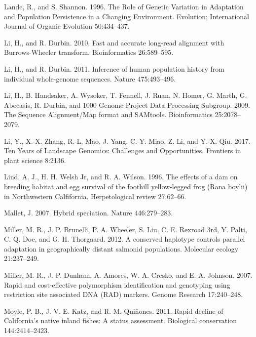 \documentclass[proquest,12pt,final]{ucthesis-CA2012} %
\begin{document}
\begin{ucmainmatter}
\leavevmode\hypertarget{ref-lande_role_1996}{}%
Lande, R., and S. Shannon. 1996. The Role of Genetic Variation in
Adaptation and Population Persistence in a Changing Environment.
Evolution; International Journal of Organic Evolution 50:434--437.

\leavevmode\hypertarget{ref-li_fast_2010}{}%
Li, H., and R. Durbin. 2010. Fast and accurate long-read alignment with
Burrows-Wheeler transform. Bioinformatics 26:589--595.

\leavevmode\hypertarget{ref-li_inference_2011}{}%
Li, H., and R. Durbin. 2011. Inference of human population history from
individual whole-genome sequences. Nature 475:493--496.

\leavevmode\hypertarget{ref-li_sequence_2009}{}%
Li, H., B. Handsaker, A. Wysoker, T. Fennell, J. Ruan, N. Homer, G.
Marth, G. Abecasis, R. Durbin, and 1000 Genome Project Data Processing
Subgroup. 2009. The Sequence Alignment/Map format and SAMtools.
Bioinformatics 25:2078--2079.

\leavevmode\hypertarget{ref-li_ten_2017}{}%
Li, Y., X.-X. Zhang, R.-L. Mao, J. Yang, C.-Y. Miao, Z. Li, and Y.-X.
Qiu. 2017. Ten Years of Landscape Genomics: Challenges and
Opportunities. Frontiers in plant science 8:2136.

\leavevmode\hypertarget{ref-lind_effects_1996}{}%
Lind, A. J., H. H. Welsh Jr, and R. A. Wilson. 1996. The effects of a
dam on breeding habitat and egg survival of the foothill yellow-legged
frog (Rana boylii) in Northwestern Calfifornia. Herpetological review
27:62--66.

\leavevmode\hypertarget{ref-mallet_hybrid_2007}{}%
Mallet, J. 2007. Hybrid speciation. Nature 446:279--283.

\leavevmode\hypertarget{ref-miller_conserved_2012}{}%
Miller, M. R., J. P. Brunelli, P. A. Wheeler, S. Liu, C. E. Rexroad 3rd,
Y. Palti, C. Q. Doe, and G. H. Thorgaard. 2012. A conserved haplotype
controls parallel adaptation in geographically distant salmonid
populations. Molecular ecology 21:237--249.

\leavevmode\hypertarget{ref-miller_rapid_2007}{}%
Miller, M. R., J. P. Dunham, A. Amores, W. A. Cresko, and E. A. Johnson.
2007. Rapid and cost-effective polymorphism identification and
genotyping using restriction site associated DNA (RAD) markers. Genome
Research 17:240--248.

\leavevmode\hypertarget{ref-moyle_rapid_2011}{}%
Moyle, P. B., J. V. E. Katz, and R. M. Quiñones. 2011. Rapid decline of
California's native inland fishes: A status assessment. Biological
conservation 144:2414--2423.


\end{ucmainmatter}
\end{document}
